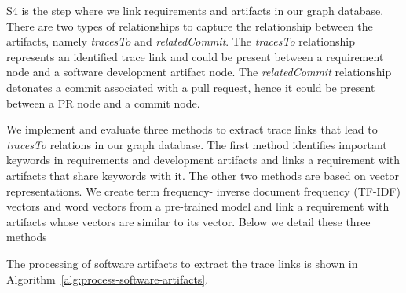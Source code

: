       \textsf{S4} is the step where we link requirements and artifacts in our graph database. There are two types of relationships to capture the relationship between the artifacts, namely \emph{tracesTo} and \emph{relatedCommit}. The  \emph{tracesTo} relationship represents an identified trace link and could be present between a requirement node and a software development artifact node. The \emph{relatedCommit} relationship detonates a commit associated with a pull request, hence it could be present between a PR node and a commit node.

      We implement and evaluate three methods to extract trace links that lead to \emph{tracesTo} relations in our graph database. The first method identifies important keywords in requirements and development artifacts and links a requirement with artifacts that share keywords with it. The other two methods are based on vector representations. We create term frequency- inverse document frequency (TF-IDF) vectors and word vectors from a pre-trained model and link a requirement with artifacts whose vectors are similar to its vector. Below we detail these three methods %


      The processing of software artifacts to extract the trace links is shown in Algorithm~\ref{alg:process-software-artifacts}.

      
